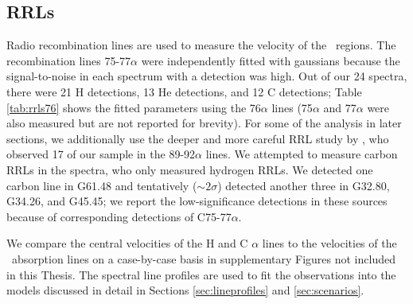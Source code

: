 \subsection{RRLs}
Radio recombination lines are used to measure the velocity of the \uchii\ regions.
The recombination lines 75-77$\alpha$ were independently fitted with gaussians
because the signal-to-noise in each spectrum with a detection was high. Out of our 24
spectra, there were 21 H detections, 13 He detections, and 12 C detections;
Table \ref{tab:rrls76} shows the fitted parameters using the 76$\alpha$ lines
(75$\alpha$ and 77$\alpha$ were also measured but are not reported for
brevity).  For some of the analysis in later sections, we additionally use the
deeper and more careful RRL study by \citet{Roshi2005}, who observed 17 of our
sample in the 89-92$\alpha$ lines.  We attempted to measure carbon RRLs in the
\citet{Araya2002} spectra, who only measured hydrogen RRLs.  We detected one
carbon line in G61.48 and tentatively ($\sim2\sigma$) detected another three in
G32.80, G34.26, and G45.45; we report the low-significance detections in these
sources because of corresponding detections of C75-77$\alpha$.

We compare the central velocities of the H and C $\alpha$ lines to the
velocities of the \formaldehyde\ absorption lines on a case-by-case basis in
supplementary Figures not included in this Thesis. %
The spectral line
profiles are used to fit the observations into the models discussed in detail
in Sections \ref{sec:lineprofiles} and \ref{sec:scenarios}.



%

